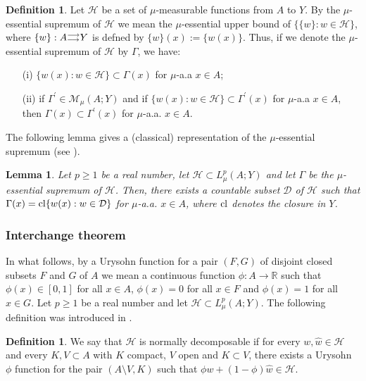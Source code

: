 \documentclass[10pt]{amsart}
\numberwithin{equation}{section}
\newtheorem{lemma}[theorem]{Lemma}
\theoremstyle{definition}
\newtheorem{definition}[theorem]{Definition}
\theoremstyle{remark}
\begin{document}
\begin{definition}
Let $\mathcal{H}$ be a set of $\mu$-measurable functions from $A$ to $Y$. By the $\mu$-essential supremum of $\mathcal{H}$ we mean the $\mu$-essential upper bound of $\{\{w\}:w\in\mathcal{H}\}$, where $\{w\}:A{{\scriptstyle\buildrel{\scriptstyle\longrightarrow}
\over{{}_{\scriptstyle\longrightarrow}}}} Y$ is defned by $\{w\}(x):=\{w(x)\}$. Thus, if we denote the $\mu$-essential supremum of $\mathcal{H}$ by $\Gamma$, we have:
\begin{itemize}
\item[(i)] $\{w(x):w\in\mathcal{H}\}\subset\Gamma(x)$ for $\mu$-a.a $x\in A$;
\item[(ii)] if $\Gamma^\prime\in\mathcal{M}_\mu(A;Y)$ and if $\{w(x):w\in\mathcal{H}\}\subset\Gamma^\prime(x)$ for $\mu$-a.a $x\in A$, then $\Gamma(x)\subset\Gamma^\prime(x)$ for $\mu$-a.a. $x\in A$.
\end{itemize}
\end{definition}

The following lemma gives a (classical) representation of the $\mu$-essential supremum (see \cite{bouchitte-valadier88}).
\begin{lemma}\label{representation-mu-ess-sup}
Let $p\geq 1$ be a real number, let $\mathcal{H}\subset L^p_\mu(A;Y)$ and let $\Gamma$ be the $\mu$-essential supremum of $\mathcal{H}$. Then, there exists a countable subset $\mathcal{D}$ of $\mathcal{H}$ such that $\Gamma(x)={\rm cl}\{w(x):w\in\mathcal{D}\}$ for $\mu$-a.a. $x\in A$, where ${\rm cl}$ denotes the closure in $Y$.
\end{lemma}

\subsubsection{Interchange theorem}  In what follows, by a Urysohn function for a pair $(F,G)$ of disjoint closed subsets $F$ and $G$ of $A$ we mean a continuous function $\phi:A\to{{\mathbb R}}$ such that $\phi(x)\in[0,1]$ for all $x\in A$, $\phi(x)=0$ for all $x\in F$ and $\phi(x)=1$ for all $x\in G$. Let $p\geq 1$ be a real number and let $\mathcal{H}\subset L^p_\mu(A;Y)$. The following definition was introduced in \cite{oah-jpm03}.
\begin{definition}
We say that $\mathcal{H}$ is normally decomposable if for every $w,\hat w\in\mathcal{H}$ and every $K,V\subset A$ with $K$ compact, $V$ open and $K\subset V$, there exists a Urysohn $\phi$ function for the pair $(A\setminus V,K)$ such that $\phi w+(1-\phi)\hat w\in\mathcal{H}$.
\end{definition}
\end{document}
